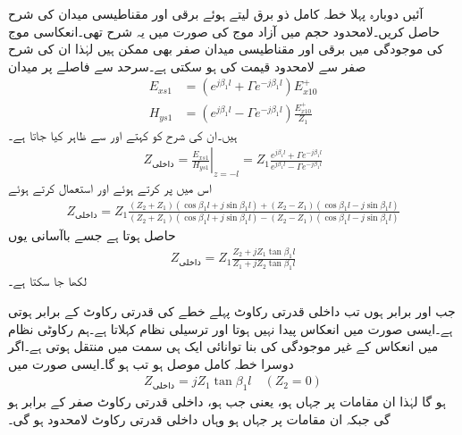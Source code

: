 آئیں دوبارہ پہلا خطہ کامل ذو برق لیتے ہوئے برقی اور مقناطیسی میدان کی شرح حاصل کریں۔لامحدود حجم میں آزاد موج کی صورت میں یہ شرح  تھی۔انعکاسی موج کی موجودگی میں برقی اور مقناطیسی میدان صفر بھی ممکن ہیں لہٰذا ان کی شرح صفر سے لامحدود قیمت کی ہو سکتی ہے۔سرحد سے  فاصلے پر میدان
 \begin{align*}
E_{xs1}&=\left(e^{j \beta_1 l}+ \Gamma e^{-j \beta_1 l} \right)E_{x10}^+ \\
H_{ys1}&=\left(e^{j \beta_1 l}- \Gamma e^{-j \beta_1 l} \right) \frac{E_{x10}^+}{Z_1}
\end{align*}
ہیں۔ان کی شرح کو  کہتے اور  سے ظاہر کیا جاتا ہے۔
\begin{align*}
Z_{\text{داخلی}}=\left. \frac{E_{xs1}}{H_{ys1}} \right|_{z=-l}=Z_1 \frac{e^{j \beta_1 l}+ \Gamma e^{-j \beta_1 l}}{e^{j \beta_1 l}- \Gamma e^{-j \beta_1 l}}
\end{align*}
اس میں  پر کرتے ہوئے اور   استعمال کرتے ہوئے
\begin{align*}
Z_{\text{داخلی}}=Z_1 \frac{(Z_2+Z_1)(\cos \beta_1 l +j \sin \beta_1 l)+(Z_2-Z_1)(\cos \beta_1 l -j \sin \beta_1 l)}{(Z_2+Z_1)(\cos \beta_1 l +j \sin \beta_1 l)-(Z_2-Z_1)(\cos \beta_1 l -j \sin \beta_1 l)}
\end{align*}
حاصل ہوتا ہے  جسے باآسانی یوں
\begin{align}\label{مساوات+موج_ترسیلی_نظام_داخلی_قدرتی_رکاوٹ_تعریف}
Z_{\text{داخلی}}=Z_1 \frac{Z_2 +j Z_1 \tan \beta_1 l}{Z_1+j Z_2 \tan \beta_1 l}
\end{align}
لکھا جا سکتا ہے۔

جب  اور  برابر ہوں تب داخلی قدرتی رکاوٹ  پہلے خطے کی قدرتی رکاوٹ  کے برابر ہوتی ہے۔ایسی صورت میں انعکاس پیدا نہیں ہوتا اور  ترسیلی نظام  کہلاتا ہے۔ہم رکاوٹی نظام میں انعکاس کے غیر موجودگی کی بنا توانائی ایک ہی سمت میں منتقل ہوتی ہے۔اگر دوسرا خطہ کامل موصل ہو تب  ہو گا۔ایسی صورت میں
\begin{align}
Z_{\text{داخلی}}=j Z_1 \tan \beta_1 l \quad (Z_2=0)
\end{align}
ہو گا لہٰذا ان مقامات پر جہاں  ہو، یعنی جب  ہو، داخلی قدرتی رکاوٹ صفر کے برابر ہو گی جبکہ ان مقامات پر جہاں  ہو وہاں داخلی قدرتی رکاوٹ لامحدود ہو گی۔

